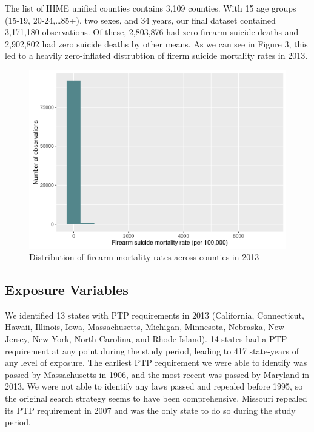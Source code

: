 \documentclass[]{article}
\begin{document}
The list of IHME unified counties contains 3,109 counties. With 15 age
groups (15-19, 20-24,\ldots{}85+), two sexes, and 34 years, our final
dataset contained 3,171,180 observations. Of these, 2,803,876 had zero
firearm suicide deaths and 2,902,802 had zero suicide deaths by other
means. As we can see in Figure 3, this led to a heavily zero-inflated
distrubtion of firerm suicide mortality rates in 2013.

\begin{figure}[htbp]
\centering
\includegraphics{Thesis_files/figure-latex/zero-hist-1.pdf}
\caption{Distribution of firearm mortality rates across counties in
2013}
\end{figure}

\subsection{Exposure Variables}\label{exposure-variables}

We identified 13 states with PTP requirements in 2013 (California,
Connecticut, Hawaii, Illinois, Iowa, Massachusetts, Michigan, Minnesota,
Nebraska, New Jersey, New York, North Carolina, and Rhode Island). 14
states had a PTP requirement at any point during the study period,
leading to 417 state-years of any level of exposure. The earliest PTP
requirement we were able to identify was passed by Massachusetts in
1906, and the most recent was passed by Maryland in 2013. We were not
able to identify any laws passed and repealed before 1995, so the
original search strategy seems to have been comprehensive. Missouri
repealed its PTP requirement in 2007 and was the only state to do so
during the study period.
\end{document}
